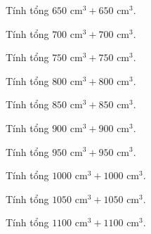 \begin{ex}
  Tính tổng $650\text{ cm}^3 + 650\text{ cm}^3$.
\end{ex}

\begin{ex}
  Tính tổng $700\text{ cm}^3 + 700\text{ cm}^3$.
\end{ex}

\begin{ex}
  Tính tổng $750\text{ cm}^3 + 750\text{ cm}^3$.
\end{ex}

\begin{ex}
  Tính tổng $800\text{ cm}^3 + 800\text{ cm}^3$.
\end{ex}

\begin{ex}
  Tính tổng $850\text{ cm}^3 + 850\text{ cm}^3$.
\end{ex}

\begin{ex}
  Tính tổng $900\text{ cm}^3 + 900\text{ cm}^3$.
\end{ex}

\begin{ex}
  Tính tổng $950\text{ cm}^3 + 950\text{ cm}^3$.
\end{ex}

\begin{ex}
  Tính tổng $1000\text{ cm}^3 + 1000\text{ cm}^3$.
\end{ex}

\begin{ex}
  Tính tổng $1050\text{ cm}^3 + 1050\text{ cm}^3$.
\end{ex}

\begin{ex}
  Tính tổng $1100\text{ cm}^3 + 1100\text{ cm}^3$.
\end{ex}

